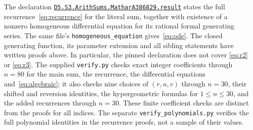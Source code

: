 \documentclass[11pt]{article}
\begin{document}
The declaration
\href{https://github.com/the-omega-institute/trureturing/blob/074df09ddbbef1843ddb383577bfaa827f753e36/D5/S3/ArithSums/MatharA386829.lean#L233}{\texttt{D5.S3.ArithSums.MatharA386829.result}}
states the full recurrence~\eqref{eq:recurrence} for the literal sum,
together with existence of a nonzero homogeneous differential equation
for its rational formal generating series. The same file's
\texttt{homogeneous\_equation} gives~\eqref{eq:ode}.
The closed generating function, its parameter extension and all sibling
statements have written proofs above. In particular, the pinned declaration
does not cover \eqref{eq:r2} or \eqref{eq:r3}.
The supplied \texttt{verify.py}
checks exact integer coefficients through $n=80$ for the main sum,
the recurrence, the differential equations and~\eqref{eq:algebraic};
it also checks nine choices of $(r,u,v)$ through $n=30$, their
shifted and reversion identities, the hypergeometric formulas for
$1\leq n\leq30$, and the added recurrences through $n=30$.
These finite coefficient checks are distinct from the proofs for all indices.
The separate \texttt{verify\_polynomials.py} verifies the full polynomial
identities in the recurrence proofs, not a sample of their values.
\end{document}
